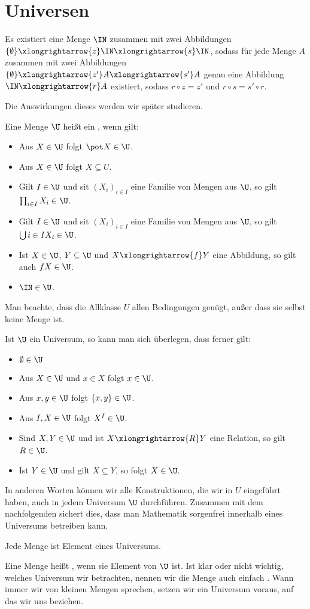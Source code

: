 \section{Universen}

\begin{axiom}
Es existiert eine Menge $\IN$ zusammen mit zwei Abbildungen $\{\emptyset\}\xlongrightarrow{z}\IN\xlongrightarrow{s}\IN$, sodass für jede Menge $A$ zusammen mit zwei Abbildungen $\{\emptyset\}\xlongrightarrow{z'}A\xlongrightarrow{s'}A$ genau eine Abbildung $\IN\xlongrightarrow{r}A$ existiert, sodass $r\circ z=z'$ und $r\circ s=s'\circ r$.
\end{axiom}
Die Auswirkungen dieses  werden wir später studieren.

Eine Menge $\U$ heißt ein , wenn gilt:
\begin{itemize}
\item Aus $X\in\U$ folgt $\pot X\in\U$.
\item Aus $X\in\U$ folgt $X\subseteq U$.
\item Gilt $I\in\U$ und sit $(X_i)_{i\in I}$ eine Familie von Mengen aus $\U$, so gilt $\prod_{i\in I}X_i\in\U$.
\item Gilt $I\in\U$ und sit $(X_i)_{i\in I}$ eine Familie von Mengen aus $\U$, so gilt $\bigcup{i\in I}X_i\in\U$.
\item Ist $X\in\U$, $Y\subseteq\U$ und $X\xlongrightarrow{f}Y$ eine Abbildung, so gilt auch $fX\in\U$.
\item $\IN\in\U$.
\end{itemize}

Man beachte, dass die Allklasse $U$ allen Bedingungen genügt, außer dass sie selbst keine Menge ist.

Ist $\U$ ein Universum, so kann man sich überlegen, dass ferner gilt:

\begin{itemize}
\item $\emptyset\in\U$
\item Aus $X\in\U$ und $x\in X$ folgt $x\in\U$.
\item Aus $x,y\in\U$ folgt $\{x,y\}\in\U$.
\item Aus $I,X\in\U$ folgt $X^I\in\U$.
\item Sind $X,Y\in\U$ und ist $X\xlongrightarrow{R}Y$ eine Relation, so gilt $R\in\U$.
\item Ist $Y\in\U$ und gilt $X\subseteq Y$, so folgt $X\in\U$.
\end{itemize}

In anderen Worten können wir alle Konstruktionen, die wir in $U$ eingeführt haben, auch in jedem Universum $\U$ durchführen. Zusammen mit dem nachfolgenden  sichert dies, dass man Mathematik sorgenfrei innerhalb eines Universums betreiben kann.

\begin{axiom}
Jede Menge ist Element eines Universums.
\end{axiom}

Eine Menge heißt , wenn sie Element von $\U$ ist. Ist klar oder nicht wichtig, welches Universum wir betrachten, nennen wir die Menge auch einfach . Wann immer wir von kleinen Mengen sprechen, setzen wir ein Universum voraus, auf das wir uns beziehen.
